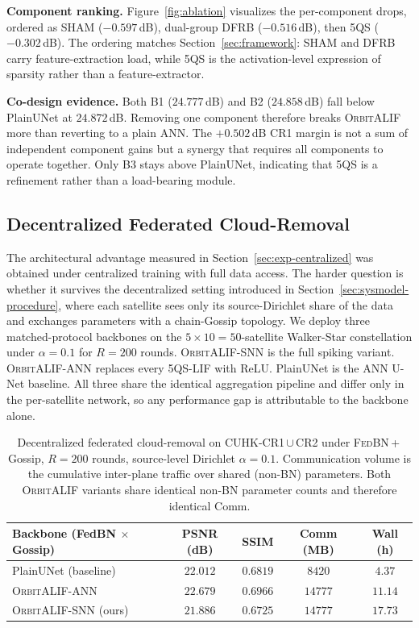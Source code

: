 \documentclass[conference]{IEEEtran}
\newcommand{\OrbitALIF}{\textsc{OrbitALIF}}
\newcommand{\FQS}{5QS}
\newcommand{\DFRB}{\textsc{DFRB}}
\newcommand{\SHAM}{\textsc{SHAM}}
\begin{document}
\textbf{Component ranking.} Figure~\ref{fig:ablation} visualizes
the per-component drops, ordered as \SHAM{} ($-0.597$\,dB),
dual-group \DFRB{} ($-0.516$\,dB), then \FQS{} ($-0.302$\,dB).
The ordering matches Section~\ref{sec:framework}: \SHAM{} and
\DFRB{} carry feature-extraction load, while \FQS{} is the
activation-level expression of sparsity rather than a
feature-extractor.

\textbf{Co-design evidence.} Both B1 ($24.777$\,dB) and B2
($24.858$\,dB) fall below PlainUNet at $24.872$\,dB. Removing one
component therefore breaks \OrbitALIF{} more than reverting to a
plain ANN. The $+0.502$\,dB CR1 margin is not a sum of independent
component gains but a synergy that requires all components to
operate together. Only B3 stays above PlainUNet, indicating that
\FQS{} is a refinement rather than a load-bearing module.

\subsection{Decentralized Federated Cloud-Removal}\label{sec:exp-federated}

The architectural advantage measured in
Section~\ref{sec:exp-centralized} was obtained under centralized
training with full data access. The harder question is whether it
survives the decentralized setting introduced in
Section~\ref{sec:sysmodel-procedure}, where each satellite sees
only its source-Dirichlet share of the data and exchanges
parameters with a chain-Gossip topology. We deploy three
matched-protocol backbones on the $5\!\times\!10\!=\!50$-satellite
Walker-Star constellation under $\alpha\!=\!0.1$ for $R\!=\!200$
rounds. \OrbitALIF{}-SNN is the full spiking variant.
\OrbitALIF{}-ANN replaces every \FQS{}-LIF with ReLU. PlainUNet is
the ANN U-Net baseline. All three share the identical aggregation
pipeline and differ only in the per-satellite network, so any
performance gap is attributable to the backbone alone.

\begin{table}[!htbp]
\centering
\caption{Decentralized federated cloud-removal on CUHK-CR1\,$\cup$\,CR2
under \textsc{FedBN}\,+\,Gossip, $R\!=\!200$ rounds, source-level
Dirichlet $\alpha\!=\!0.1$. Communication volume is the cumulative
inter-plane traffic over shared (non-BN) parameters. Both
\OrbitALIF{} variants share identical non-BN parameter counts and
therefore identical Comm.}
\label{tab:federated}
\begin{tabular}{lcccc}
\toprule
Backbone (FedBN $\times$ Gossip)    & PSNR (dB)         & SSIM              & Comm (MB) & Wall (h) \\
\midrule
PlainUNet (baseline)                 & $22.012$          & $0.6819$          & $8420$     & $4.37$  \\
\OrbitALIF{}-ANN                     & $\mathbf{22.679}$ & $\mathbf{0.6966}$ & $14777$    & $11.14$ \\
\OrbitALIF{}-SNN (ours)              & $21.886$          & $0.6725$          & $14777$    & $17.73$ \\
\bottomrule
\end{tabular}
\end{table}
\end{document}

